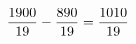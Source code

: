 \documentclass[preview]{standalone}
\begin{document}
\begin{align*}
\special{dvisvgm:raw <g id='unique000'>}\frac{1900}{19} - \frac{890}{19} = \frac{1010}{19}\special{dvisvgm:raw </g>}
\end{align*}
\end{document}
